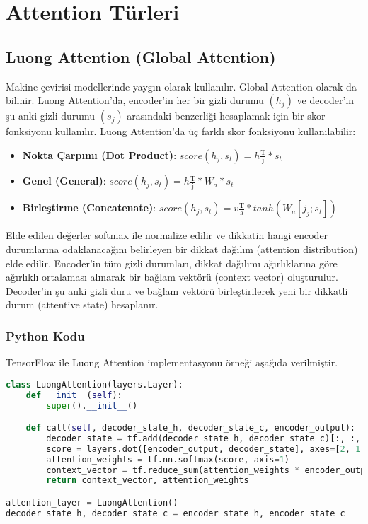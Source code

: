 \section{Attention Türleri}
\subsection{Luong Attention (Global Attention)}
Makine çevirisi modellerinde yaygın olarak kullanılır. Global Attention olarak da bilinir. Luong Attention'da, encoder'in her bir gizli durumu  $(h_j)$ ve decoder'in şu anki gizli durumu $(s_j)$ arasındaki benzerliği hesaplamak için bir skor fonksiyonu kullanılır. Luong Attention'da üç farklı skor fonksiyonu kullanılabilir:
\begin{itemize}
	\item \textbf{Nokta Çarpımı (Dot Product)}: $score(h_j, s_t) = h \frac{\text{T}}{\text{j}} * s_t $
	\item \textbf{Genel (General)}: $score(h_j, s_t) = h \frac{\text{T}}{\text{j}} * W_a * s_t$
	\item \textbf{Birleştirme (Concatenate)}: $score(h_j, s_t) = v \frac{\text{T}}{\text{a}} * tanh(W_a [j_j;s_t])$
\end{itemize} 

Elde edilen değerler softmax ile normalize edilir ve dikkatin hangi encoder durumlarına odaklanacağını belirleyen bir dikkat dağılım (attention distribution) elde edilir. Encoder'in tüm gizli durumları, dikkat dağılımı ağırlıklarına göre ağırlıklı ortalaması alınarak bir bağlam vektörü (context vector) oluşturulur. Decoder'in şu anki gizli duru ve bağlam vektörü birleştirilerek yeni bir dikkatli durum (attentive state) hesaplanır.

\subsubsection{Python Kodu}

TensorFlow ile Luong Attention implementasyonu örneği aşağıda verilmiştir.

\begin{lstlisting}[language=Python]
class LuongAttention(layers.Layer):
    def __init__(self):
        super().__init__()

    def call(self, decoder_state_h, decoder_state_c, encoder_output):
        decoder_state = tf.add(decoder_state_h, decoder_state_c)[:, :, tf.newaxis]
        score = layers.dot([encoder_output, decoder_state], axes=[2, 1])
        attention_weights = tf.nn.softmax(score, axis=1)
        context_vector = tf.reduce_sum(attention_weights * encoder_output, axis=1)
        return context_vector, attention_weights

attention_layer = LuongAttention()
decoder_state_h, decoder_state_c = encoder_state_h, encoder_state_c
\end{lstlisting}

